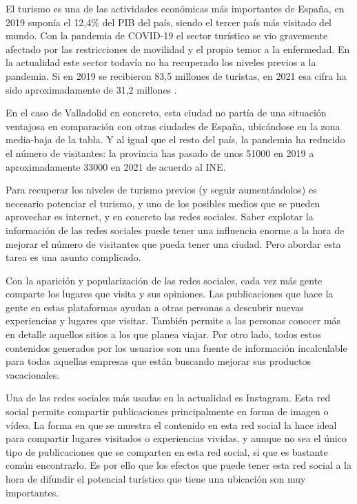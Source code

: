 

El turismo es una de las actividades económicas más importantes de España, en 2019 suponía el 12,4\% del PIB del país, siendo el tercer país más visitado del mundo. Con la pandemia de COVID-19 el sector turístico se vio gravemente afectado por las restricciones de movilidad y el propio temor a la enfermedad. En la actualidad este sector todavía no ha recuperado los niveles previos a la pandemia. Si en 2019 se recibieron 83,5 millones de turistas, en 2021 esa cifra ha sido aproximadamente de 31,2 millones \cite{turismo_espana}.

En el caso de Valladolid en concreto, esta ciudad no partía de una situación ventajosa en comparación con otras ciudades de España, ubicándose en la zona media-baja de la tabla. Y al igual que el resto del país, la pandemia ha reducido el número de visitantes: la provincia has pasado de unos 51000 en 2019 a aproximadamente 33000 en 2021 de acuerdo al INE. 

Para recuperar los niveles de turismo previos (y seguir aumentándolos) es necesario potenciar el turismo, y uno de los posibles medios que se pueden aprovechar es internet, y en concreto las redes sociales. Saber explotar la información de las redes sociales puede tener una influencia enorme a la hora de mejorar el número de visitantes que pueda tener una ciudad. Pero abordar esta tarea es una asunto complicado.

Con la aparición y popularización de las redes sociales, cada vez más gente comparte los lugares que visita y sus opiniones. Las publicaciones que hace la gente en estas plataformas ayudan a otras personas a descubrir nuevas experiencias y lugares que visitar. También permite a las personas conocer más en detalle aquellos sitios a los que planea viajar. Por otro lado, todos estos contenidos generados por los usuarios son una fuente de información incalculable para todas aquellas empresas que están buscando mejorar sus productos vacacionales.

Una de las redes sociales más usadas en la actualidad es Instagram. Esta red social permite compartir publicaciones principalmente en forma de imagen o vídeo. La forma en que se muestra el contenido en esta red social la hace ideal para compartir lugares visitados o experiencias vividas, y aunque no sea el único tipo de publicaciones que se comparten en esta red social, si que es bastante común encontrarlo. Es por ello que los efectos que puede tener esta red social a la hora de difundir el potencial turístico que tiene una ubicación son muy importantes.

